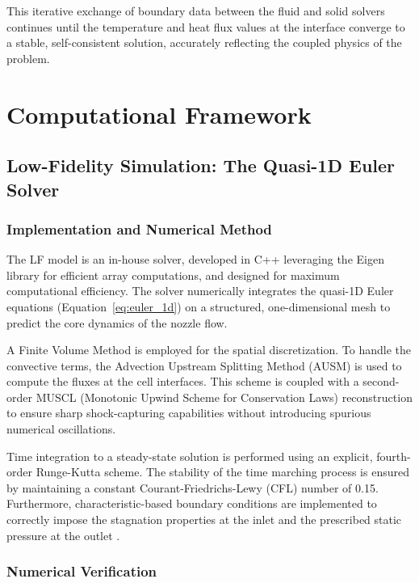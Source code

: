 \documentclass[tg, EN]{ufabcFHZh_tg}
\begin{document}
This iterative exchange of boundary data between the fluid and solid solvers continues until the temperature and heat flux values at the interface converge to a stable, self-consistent solution, accurately reflecting the coupled physics of the problem.

\chapter{Computational Framework}
\label{chap:computational_framework}

\section{Low-Fidelity Simulation: The Quasi-1D Euler Solver}
\label{sec:lf_model}

\subsection{Implementation and Numerical Method}

The LF model is an in-house solver, developed in C++ leveraging the Eigen library for efficient array computations, and designed for maximum computational efficiency. The solver numerically integrates the quasi-1D Euler equations (Equation~\ref{eq:euler_1d}) on a structured, one-dimensional mesh to predict the core dynamics of the nozzle flow.

A Finite Volume Method is employed for the spatial discretization. To handle the convective terms, the Advection Upstream Splitting Method (AUSM) is used to compute the fluxes at the cell interfaces. This scheme is coupled with a second-order MUSCL (Monotonic Upwind Scheme for Conservation Laws) reconstruction to ensure sharp shock-capturing capabilities without introducing spurious numerical oscillations.

Time integration to a steady-state solution is performed using an explicit, fourth-order Runge-Kutta scheme. The stability of the time marching process is ensured by maintaining a constant Courant-Friedrichs-Lewy (CFL) number of 0.15. Furthermore, characteristic-based boundary conditions are implemented to correctly impose the stagnation properties at the inlet and the prescribed static pressure at the outlet \citep{hirsch1988numerical, hirsch1990numerical}.

\subsection{Numerical Verification}
\end{document}
